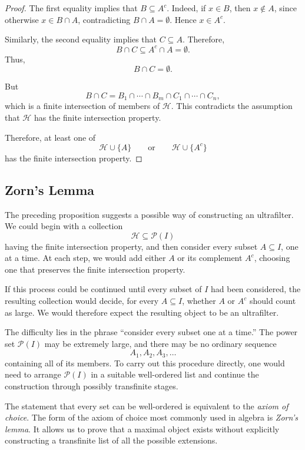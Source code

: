 {\begin{proof}
The first equality implies that \(B\subseteq A^c\). Indeed, if \(x\in B\),
then \(x\notin A\), since otherwise \(x\in B\cap A\), contradicting
\(B\cap A=\emptyset\). Hence \(x\in A^c\).

Similarly, the second equality implies that \(C\subseteq A\). Therefore,
\[
B\cap C
\subseteq
A^c\cap A
=
\emptyset.
\]
Thus,
\[
B\cap C=\emptyset.
\]

But
\[
B\cap C
=
B_1\cap\cdots\cap B_m\cap C_1\cap\cdots\cap C_n,
\]
which is a finite intersection of members of \(\mathcal{H}\). This
contradicts the assumption that \(\mathcal{H}\) has the finite intersection
property.

Therefore, at least one of
\[
\mathcal{H}\cup\{A\}
\qquad\text{or}\qquad
\mathcal{H}\cup\{A^c\}
\]
has the finite intersection property.
\end{proof}

\subsection{Zorn's Lemma}
\label{subsec:zorns-lemma}

The preceding proposition suggests a possible way of constructing an
ultrafilter. We could begin with a collection
\[
\mathcal{H}\subseteq\mathcal{P}(I)
\]
having the finite intersection property, and then consider every subset
\(A\subseteq I\), one at a time. At each step, we would add either \(A\) or
its complement \(A^c\), choosing one that preserves the finite intersection
property.

If this process could be continued until every subset of \(I\) had been
considered, the resulting collection would decide, for every
\(A\subseteq I\), whether \(A\) or \(A^c\) should count as large. We would
therefore expect the resulting object to be an ultrafilter.

The difficulty lies in the phrase ``consider every subset one at a time.''
The power set \(\mathcal{P}(I)\) may be extremely large, and there may be no
ordinary sequence
\[
A_1,A_2,A_3,\ldots
\]
containing all of its members. To carry out this procedure directly, one
would need to arrange \(\mathcal{P}(I)\) in a suitable well-ordered list and
continue the construction through possibly transfinite stages.

The statement that every set can be well-ordered is equivalent to the
\emph{axiom of choice}. The form of the axiom of choice most commonly used
in algebra is \emph{Zorn's lemma}. It allows us to prove that a maximal
object exists without explicitly constructing a transfinite list of all the
possible extensions.

}
